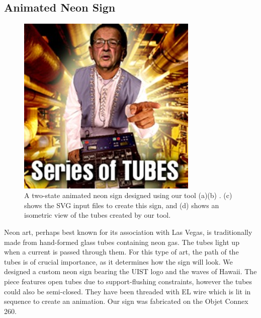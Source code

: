 \subsection{Animated Neon Sign}

\begin{figure}[h]
\centering
    \includegraphics[width=3.4in]{figures/series-of-tubes.jpg}
\caption{A two-state animated neon sign designed using our tool (a)(b) .  (c) shows the SVG input files to create this sign, and (d) shows an isometric view of the tubes created by our tool.}
\label{fig:neon}
\end{figure}

Neon art, perhaps best known for its association with Las Vegas, is traditionally made from hand-formed glass tubes containing neon gas.  The tubes light up when a current is passed through them.  For this type of art, the path of the tubes is of crucial importance, as it determines how the sign will look.  We designed a custom neon sign bearing the UIST logo and the waves of Hawaii.  The piece features open tubes due to support-flushing constraints, however the tubes could also be semi-closed.  They have been threaded with EL wire which is lit in sequence to create an animation.  Our sign was fabricated on the Objet Connex 260.